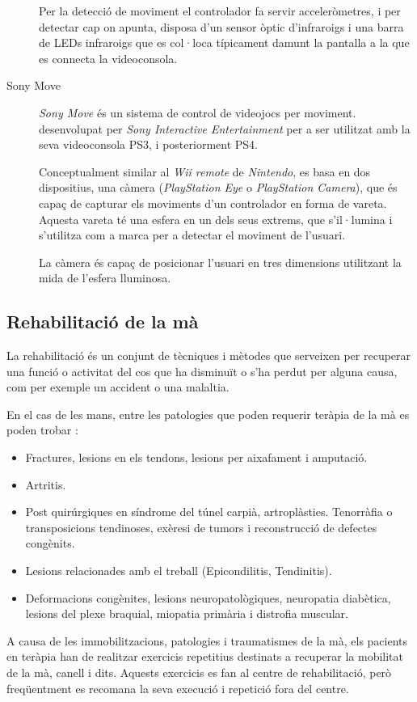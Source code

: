 \documentclass[12pt,a4paper,catalan]{article}
\begin{document}
\begin{description}
		Per la detecció de moviment el controlador fa servir acceleròmetres, i per detectar cap on apunta, disposa d'un sensor òptic d'infraroigs i una barra de LEDs infraroigs que es col·loca típicament damunt la pantalla a la que es connecta la videoconsola.
		\item[Sony Move] \textit{Sony Move} és un sistema de control de videojocs per moviment. desenvolupat per \textit{Sony Interactive Entertainment} per a ser utilitzat amb la seva videoconsola PS3, i posteriorment PS4.
		
		Conceptualment similar al \textit{Wii remote} de \textit{Nintendo}, es basa en dos dispositius, una càmera (\textit{PlayStation Eye} o \textit{PlayStation Camera}), que és capaç de capturar els moviments d'un controlador en forma de vareta. Aquesta vareta té una esfera en un dels seus extrems, que s'il·lumina i s'utilitza com a marca per a detectar el moviment de l'usuari.
		
		La càmera és capaç de posicionar l'usuari en tres dimensions utilitzant la mida de l'esfera lluminosa.
	\end{description}
	\subsection{Rehabilitació de la mà}
	La rehabilitació és un conjunt de tècniques i mètodes que serveixen per recuperar una funció o activitat del cos que ha disminuït o s'ha perdut per alguna causa, com per exemple un accident o una malaltia.
	
	En el cas de les mans, entre les patologies que poden requerir teràpia de la mà es poden trobar \cite{rehab-principles}:
	\begin{itemize}
		\item Fractures, lesions en els tendons, lesions per aixafament i amputació.
		\item Artritis.
		\item Post quirúrgiques en síndrome del túnel carpià, artroplàsties. Tenorràfia o transposicions tendinoses, exèresi de tumors i reconstrucció de defectes congènits.
		\item Lesions relacionades amb el treball (Epicondilitis, Tendinitis).
		\item Deformacions congènites, lesions neuropatològiques, neuropatia diabètica, lesions del plexe braquial, miopatia primària i distrofia muscular.
	\end{itemize}
	A causa de les immobilitzacions, patologies i traumatismes de la mà, els pacients en teràpia han de realitzar exercicis repetitius destinats a recuperar la mobilitat de la mà, canell i dits. Aquests exercicis es fan al centre de rehabilitació, però freqüentment es recomana la seva execució i repetició fora del centre.
	
\end{document}
